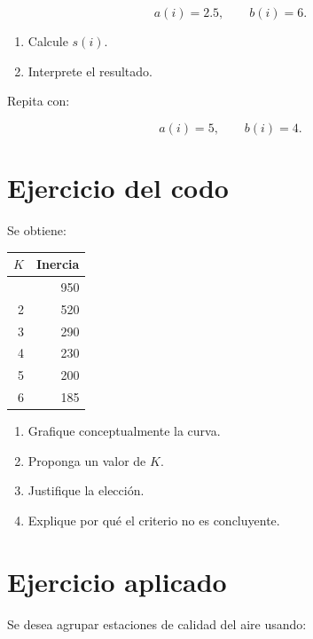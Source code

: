 \documentclass[
  spanish,
  10.5pt,
  letterpaper,
  DIV=11,
  numbers=noendperiod,
  oneside,
  open=any]{scrreprt}
\newcounter{none} %
\providecommand{\tightlist}{%
  \setlength{\itemsep}{0pt}\setlength{\parskip}{0pt}}
\theoremstyle{definition}
\theoremstyle{definition}
\theoremstyle{plain}
\theoremstyle{remark}
\begin{document}
\[
a(i)=2.5,
\qquad
b(i)=6.
\]

\begin{enumerate}
\def\labelenumi{\arabic{enumi}.}
\tightlist
\item
  Calcule \(s(i)\).
\item
  Interprete el resultado.
\end{enumerate}

Repita con:

\[
a(i)=5,
\qquad
b(i)=4.
\]

\section*{Ejercicio del codo}\label{ejercicio-del-codo}


Se obtiene:

{\def\LTcaptype{none} %
\begin{longtable}[]{@{}rr@{}}
\toprule\noalign{}
\(K\) & Inercia \\
\midrule\noalign{}
\endhead
\bottomrule\noalign{}
\endlastfoot
1 & 950 \\
2 & 520 \\
3 & 290 \\
4 & 230 \\
5 & 200 \\
6 & 185 \\
\end{longtable}
}

\begin{enumerate}
\def\labelenumi{\arabic{enumi}.}
\tightlist
\item
  Grafique conceptualmente la curva.
\item
  Proponga un valor de \(K\).
\item
  Justifique la elección.
\item
  Explique por qué el criterio no es concluyente.
\end{enumerate}

\section*{Ejercicio aplicado}\label{ejercicio-aplicado-14}


Se desea agrupar estaciones de calidad del aire usando:
\end{document}
